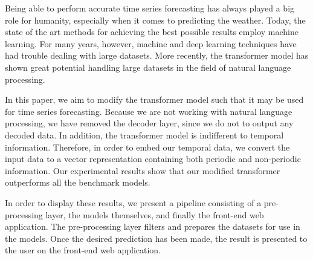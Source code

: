 Being able to perform accurate time series forecasting has always played a big role for humanity, especially when it comes to predicting the weather. 
Today, the state of the art methods for achieving the best possible results employ machine learning. 
For many years, however, machine and deep learning techniques have had trouble dealing with large datasets. 
More recently, the transformer model has shown great potential handling large datasets in the field of natural language processing.

In this paper, we aim to modify the transformer model such that it may be used for time series forecasting. 
Because we are not working with natural language processing, we have removed the decoder layer, since we do not to output any decoded data. 
In addition, the transformer model is indifferent to temporal information. 
Therefore, in order to embed our temporal data, we convert the input data to a vector representation containing both periodic and non-periodic information.
Our experimental results show that our modified transformer outperforms all the benchmark models.

In order to display these results, we present a pipeline consisting of a pre-processing layer, the models themselves, and finally the front-end web application.
The pre-processing layer filters and prepares the datasets for use in the models.
Once the desired prediction has been made, the result is presented to the user on the front-end web application.